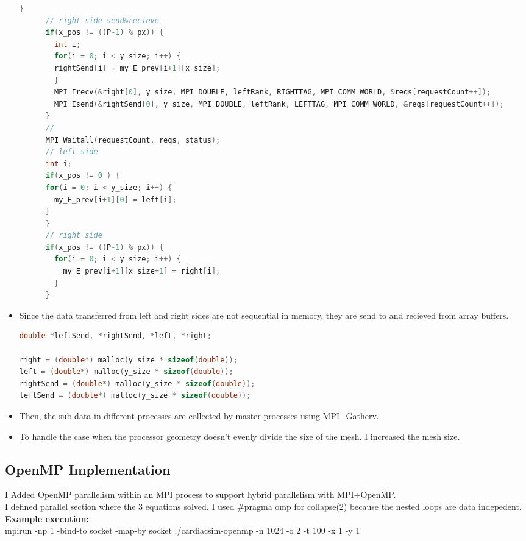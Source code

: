 \documentclass{article}
\newcommand\tab[1][0.5cm]{\hspace*{#1}}
\begin{document}
\begin{itemize}
\begin{lstlisting}[language=C]
      }
      // right side send&recieve
      if(x_pos != ((P-1) % px)) {
        int i; 
        for(i = 0; i < y_size; i++) {
        rightSend[i] = my_E_prev[i+1][x_size];
        }
        MPI_Irecv(&right[0], y_size, MPI_DOUBLE, leftRank, RIGHTTAG, MPI_COMM_WORLD, &reqs[requestCount++]);
        MPI_Isend(&rightSend[0], y_size, MPI_DOUBLE, leftRank, LEFTTAG, MPI_COMM_WORLD, &reqs[requestCount++]);   
      } 
      //
      MPI_Waitall(requestCount, reqs, status);
      // left side
      int i;
      if(x_pos != 0 ) {
      for(i = 0; i < y_size; i++) {
        my_E_prev[i+1][0] = left[i];
      }
      }
      // right side 
      if(x_pos != ((P-1) % px)) {
        for(i = 0; i < y_size; i++) {
          my_E_prev[i+1][x_size+1] = right[i];
        }
      }
\end{lstlisting}
\item Since the data transferred from left and right sides are not sequential in memory, they are send to and recieved from array buffers.
\begin{lstlisting}[language=C]
double *leftSend, *rightSend, *left, *right; 

right = (double*) malloc(y_size * sizeof(double));
left = (double*) malloc(y_size * sizeof(double));
rightSend = (double*) malloc(y_size * sizeof(double));
leftSend = (double*) malloc(y_size * sizeof(double));
\end{lstlisting}
\item Then, the sub data in different processes are collected by master processes using MPI\_Gatherv.
\item To handle the case when the processor geometry doesn’t evenly divide the size of the mesh. I increased the mesh size.
\end{itemize}

\subsection{OpenMP Implementation}
\tab I Added OpenMP parallelism within an MPI process to support hybrid parallelism with MPI+OpenMP.\\
\tab I defined parallel section where the 3 equations solved. I used \#pragma omp for collapse(2) because the nested loops are data indepedent.
\\ \tab \textbf{Example execution:}\\ mpirun -np 1 -bind-to socket -map-by socket ./cardiacsim-openmp -n 1024 -o 2 -t 100 -x 1 -y 1
\end{document}
